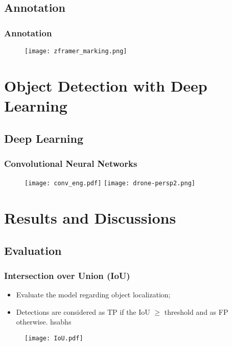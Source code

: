 \documentclass{beamer}
\begin{document}
\subsection{Annotation}

\begin{frame}\frametitle{Annotation}

\begin{figure}[htb]
	\centering
	\texttt{[image: zframer\_marking.png]}
	\label{fig:zframer1}
\end{figure}
\end{frame}

	\section{Object Detection with Deep Learning}

		\subsection{Deep Learning}

			\begin{frame}\frametitle{Convolutional Neural Networks}
				\begin{figure}[htb]
					\centering
					\texttt{[image: conv\_eng.pdf]}
					\texttt{[image: drone-persp2.png]}
					\label{fig:zframer1}
				\end{figure}
			\end{frame}

	\section{Results and Discussions}

		\subsection{Evaluation}

			\begin{frame}\frametitle{Intersection over Union (IoU)}
				\begin{itemize}
					\item Evaluate the model regarding object localization;
					\item Detections are considered as TP if the IoU $\geq$ threshold and as FP otherwise. hsabhs
				\end{itemize}
				\begin{figure}[htb]
					\centering
					\texttt{[image: IoU.pdf]}
					\label{fig:IoU}
				\end{figure}

			\end{frame}
\end{document}
